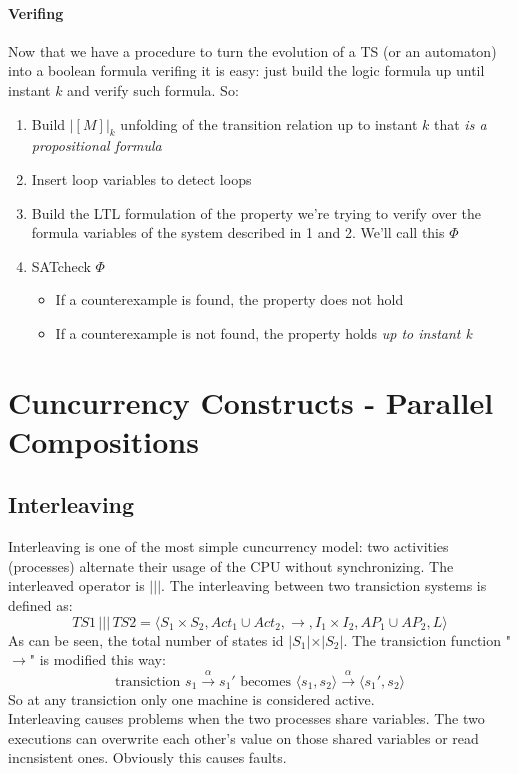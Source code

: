 \documentclass{article}
\begin{document}
					\paragraph{Verifing}
						Now that we have a procedure to turn the evolution of a TS (or an automaton) into a boolean formula verifing it is easy: just build the logic formula up until instant $k$ and verify such formula. So:
						\begin{enumerate}
							\item Build $\vert [M] \vert_{k}$ unfolding of the transition relation up to instant $k$ that \emph{is a propositional formula}
							\item Insert loop variables to detect loops
							\item Build the LTL formulation of the property we're trying to verify over the formula variables of the system described in 1 and 2. We'll call this $\Phi$
							\item SATcheck $\Phi$
								\begin{itemize}
									\item If a counterexample is found, the property does not hold
									\item If a counterexample is not found, the property holds \emph{up to instant k}
								\end{itemize}
						\end{enumerate}
					
		\section{Cuncurrency Constructs - Parallel Compositions}
			\subsection{Interleaving}
				Interleaving is one of the most simple cuncurrency model: two activities (processes) alternate their usage of the CPU without synchronizing. The interleaved operator is $\vert \vert \vert$. The interleaving between two transiction systems is defined as:
				\begin{equation}
					TS1 \,\vert\vert\vert\, TS2 = \langle S_1 \times S_2, Act_1 \cup Act_2, \rightarrow, I_1 \times I_2, AP_1 \cup AP_2, L \rangle
				\end{equation}
				As can be seen, the total number of states id $\vert S_1 \vert \times \vert S_2 \vert$. The transiction function "$\rightarrow$" is modified this way:
				\begin{equation}
					\text{transiction } s_1 \xrightarrow{\alpha} s_1' \text{ becomes } \langle s_1, s_2 \rangle \xrightarrow{\alpha} \langle s_1', s_2 \rangle 
				\end{equation}
				So at any transiction only one machine is considered active.\\
				Interleaving causes problems when the two processes share variables. The two executions can overwrite each other's value on those shared variables or read incnsistent ones. Obviously this causes faults.\\
				
\end{document}
